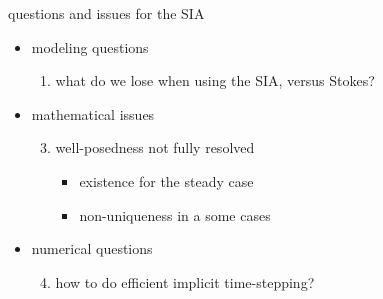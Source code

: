 \documentclass[10pt,dvipsnames]{beamer}
\begin{document}
\begin{frame}{questions and issues for the SIA}
\begin{itemize}
\item[] \alert{modeling questions}
    \begin{enumerate}
    \item what do we lose when using the SIA, versus Stokes?
    \end{enumerate}
\item[] \alert{mathematical issues}
    \begin{enumerate}\setcounter{enumi}{2}
    \item well-posedness not fully resolved
        \begin{itemize}
        \item existence for the steady case
        \item non-uniqueness in a some cases
        \end{itemize}
    \end{enumerate}
\item[] \alert{numerical questions}
    \begin{enumerate}\setcounter{enumi}{3}
    \item how to do efficient implicit time-stepping?
    \end{enumerate}
\end{itemize}
\end{frame}
\end{document}
